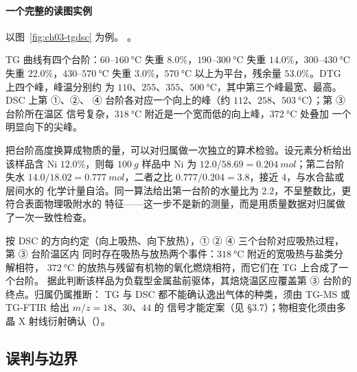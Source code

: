 \paragraph{一个完整的读图实例}以图~\ref{fig:ch03-tgdsc} 为例。
。

\begin{obs}
TG 曲线有四个台阶：$60$--$\qty{160}{\celsius}$ 失重 $8.0\%$，$190$--$\qty{300}{\celsius}$
失重 $14.0\%$，$300$--$\qty{430}{\celsius}$ 失重 $22.0\%$，$430$--$\qty{570}{\celsius}$
失重 $3.0\%$，$\qty{570}{\celsius}$ 以上为平台，残余量 $53.0\%$。DTG 上四个峰，峰温分别约
为 $110$、$255$、$355$、$\qty{500}{\celsius}$，其中第三个峰最宽、最高。DSC 上第 ①、②、
④ 台阶各对应一个向上的峰（约 $112$、$258$、$\qty{503}{\celsius}$）；第 ③ 台阶所在温区
信号复杂，$\qty{318}{\celsius}$ 附近是一个宽而低的向上峰，$\qty{372}{\celsius}$ 处叠加
一个明显向下的尖峰。
\end{obs}

把台阶高度换算成物质的量，可以对归属做一次独立的算术检验。设元素分析给出该样品含 Ni
$12.0\%$，则每 $\qty{100}{g}$ 样品中 Ni 为 $12.0/58.69=\qty{0.204}{mol}$；第二台阶失水
$14.0/18.02=\qty{0.777}{mol}$，二者之比 $0.777/0.204=3.8$，接近 $4$，与水合盐或层间水的
化学计量自洽。同一算法给出第一台阶的水量比为 $2.2$，不呈整数比，更符合表面物理吸附水的
特征——这一步不是新的测量，而是用质量数据对归属做了一次一致性检查。

\begin{infer}
按 DSC 的方向约定（向上吸热、向下放热），① ② ④ 三个台阶对应吸热过程，第 ③ 台阶温区内
同时存在吸热与放热两个事件：$\qty{318}{\celsius}$ 附近的宽吸热与盐类分解相符，
$\qty{372}{\celsius}$ 的放热与残留有机物的氧化燃烧相符，而它们在 TG 上合成了一个台阶。
据此判断该样品为负载型金属盐前驱体，其焙烧温区应覆盖第 ③ 台阶的终点。归属仍属推断：
TG 与 DSC 都不能确认逸出气体的种类，须由 TG-MS 或 TG-FTIR 给出 $m/z=18$、$30$、$44$ 的
信号才能定案（见 §3.7）；物相变化须由多晶 X 射线衍射确认（）。
\end{infer}

\subsection{误判与边界}

